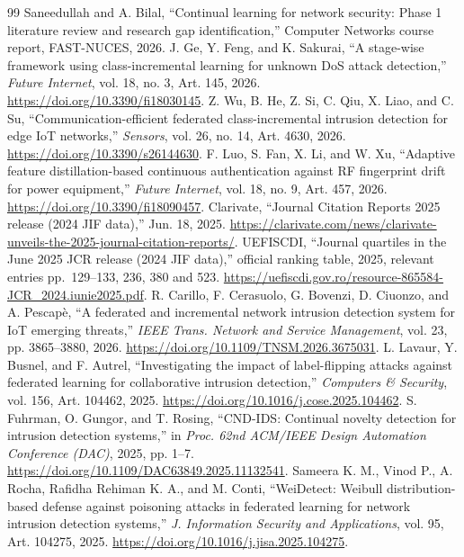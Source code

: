 \documentclass[10pt,a4paper]{article}
\begin{document}
\begin{thebibliography}{99}
\small
{} Saneedullah and A. Bilal, \enquote{Continual learning for network security: Phase 1 literature review and research gap identification,} Computer Networks course report, FAST-NUCES, 2026.
 J. Ge, Y. Feng, and K. Sakurai, \enquote{A stage-wise framework using class-incremental learning for unknown DoS attack detection,} \emph{Future Internet}, vol. 18, no. 3, Art. 145, 2026. \url{https://doi.org/10.3390/fi18030145}.
 Z. Wu, B. He, Z. Si, C. Qiu, X. Liao, and C. Su, \enquote{Communication-efficient federated class-incremental intrusion detection for edge IoT networks,} \emph{Sensors}, vol. 26, no. 14, Art. 4630, 2026. \url{https://doi.org/10.3390/s26144630}.
 F. Luo, S. Fan, X. Li, and W. Xu, \enquote{Adaptive feature distillation-based continuous authentication against RF fingerprint drift for power equipment,} \emph{Future Internet}, vol. 18, no. 9, Art. 457, 2026. \url{https://doi.org/10.3390/fi18090457}.
 Clarivate, \enquote{Journal Citation Reports 2025 release (2024 JIF data),} Jun. 18, 2025. \url{https://clarivate.com/news/clarivate-unveils-the-2025-journal-citation-reports/}.
 UEFISCDI, \enquote{Journal quartiles in the June 2025 JCR release (2024 JIF data),} official ranking table, 2025, relevant entries pp.~129--133, 236, 380 and 523. \url{https://uefiscdi.gov.ro/resource-865584-JCR_2024.iunie2025.pdf}.
 R. Carillo, F. Cerasuolo, G. Bovenzi, D. Ciuonzo, and A. Pescapè, \enquote{A federated and incremental network intrusion detection system for IoT emerging threats,} \emph{IEEE Trans. Network and Service Management}, vol. 23, pp. 3865--3880, 2026. \url{https://doi.org/10.1109/TNSM.2026.3675031}.
 L. Lavaur, Y. Busnel, and F. Autrel, \enquote{Investigating the impact of label-flipping attacks against federated learning for collaborative intrusion detection,} \emph{Computers \& Security}, vol. 156, Art. 104462, 2025. \url{https://doi.org/10.1016/j.cose.2025.104462}.
 S. Fuhrman, O. Gungor, and T. Rosing, \enquote{CND-IDS: Continual novelty detection for intrusion detection systems,} in \emph{Proc. 62nd ACM/IEEE Design Automation Conference (DAC)}, 2025, pp. 1--7. \url{https://doi.org/10.1109/DAC63849.2025.11132541}.
 Sameera K. M., Vinod P., A. Rocha, Rafidha Rehiman K. A., and M. Conti, \enquote{WeiDetect: Weibull distribution-based defense against poisoning attacks in federated learning for network intrusion detection systems,} \emph{J. Information Security and Applications}, vol. 95, Art. 104275, 2025. \url{https://doi.org/10.1016/j.jisa.2025.104275}.

\end{thebibliography}
\end{document}
